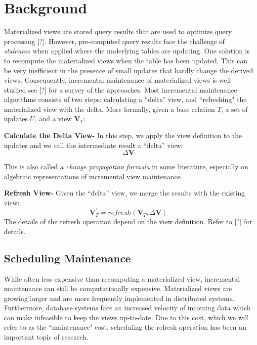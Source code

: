 \section{Background}
Materialized views are stored query results that are used 
to optimize query processing [?].
However, pre-computed query results face the challenge of \emph{staleness} when applied
where the underlying tables are updating.
One solution is to recompute the materialized views when the table has been updated.
This can be very inefficient in the presence of small updates that hardly change the derived views.
Consequently, incremental maintenance of materialized views is well studied see [?]
for a survey of the approaches. 
Most incremental maintenance algorithms consists of two steps: calculating a ``delta" view,
and ``refreshing" the materialized view with the delta.
More formally, given a base relation $T$, a set of updates $U$,
and a view $\textbf{V}_{T}$:

\textbf{Calculate the Delta View- }
In this step, we apply the view definition to the updates and we call
the intermediate result a ``delta'' view:
\[
\Delta\textbf{V}
\]

This is also called a \emph{change propagation formula} in some literature,
especially on algebraic representations of incremental view maintenance.

\textbf{Refresh View- }
Given the ``delta'' view, we merge the results with the existing
view:
\[
\textbf{V}_{T}^{'}=refresh(\textbf{V}_{T},\Delta\textbf{V})
\] 
The details of the refresh operation depend on the view definition.
Refer to [?] for details.


\subsection{Scheduling Maintenance}
While often less expensive than recomputing a materialized view,
incremental maintenance can still be computationally expensive.
Materialized views are growing larger and are more frequently 
implemented in distributed systems.
Furthermore, database systems face an increased velocity of incoming data which
can make infeasible to keep the views up-to-date.
Due to this cost, which we will refer to as the ``maintenance" cost, 
scheduling the refresh operation has been an important topic of research.

